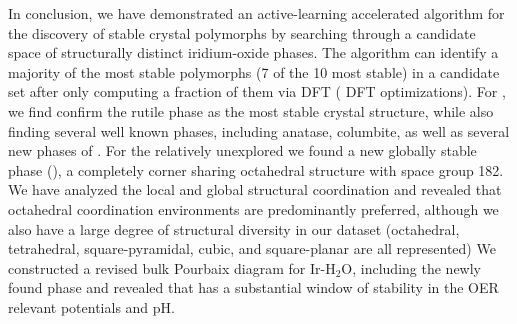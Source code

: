 


%
In conclusion, we have demonstrated an active-learning accelerated algorithm for the discovery of stable crystal polymorphs by searching through a candidate space of structurally distinct iridium-oxide phases.
%
The algorithm can identify a majority of the most stable polymorphs (7 of the 10 most stable) in a candidate set after only computing a fraction of them via DFT ( DFT optimizations).
%
For \IrOtwo, we find confirm the rutile phase as the most stable crystal structure, while also finding several well known phases, including anatase, columbite, as well as several new phases of \IrOtwo.
%
For the relatively unexplored \IrOthree we found a new globally stable phase (\aIrOthree), a completely corner sharing octahedral structure with space group 182.
%
%
We have analyzed the local and global structural coordination and revealed that octahedral coordination environments are predominantly preferred, although we also have a large degree of structural diversity in our dataset (octahedral, tetrahedral, square-pyramidal, cubic, and square-planar are all represented)
%
%
We constructed a revised bulk Pourbaix diagram for Ir-H$_2$O, including the newly found \aIrOthree phase and revealed that \aIrOthree has a substantial window of stability in the OER relevant potentials and pH.


